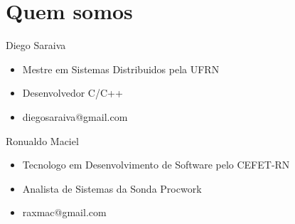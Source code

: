 \section{Quem somos}

\begin{frame}
	\begin{block}{Diego Saraiva}
		\begin{itemize}
		  \item Mestre em Sistemas Distribuidos pela UFRN
		  \item Desenvolvedor C/C++
		  \item diegosaraiva@gmail.com
		\end{itemize}
	\end{block}
	
	\begin{block}{Ronualdo Maciel}
		\begin{itemize}
			\item Tecnologo em Desenvolvimento de Software pelo CEFET-RN
			\item Analista de Sistemas da Sonda Procwork
			\item raxmac@gmail.com
		\end{itemize}
	\end{block}
\end{frame}